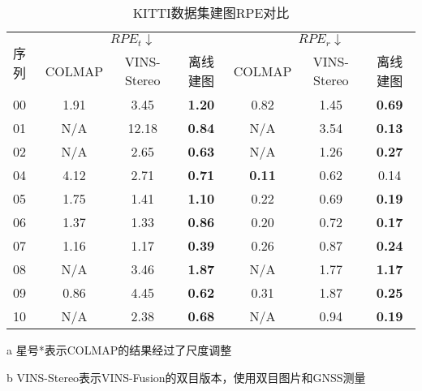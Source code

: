 \begin{table}
\centering
\begin{threeparttable}
\caption{KITTI数据集建图RPE\textdownarrow{}对比}
\begin{tabular}{lcccccc}
\toprule
\multirow{2}{*}{序列} & \multicolumn{3}{c}{$RPE_t \downarrow$}              & \multicolumn{3}{c}{$RPE_r\downarrow$}                    \\ \cline{2-7} 
                    & COLMAP & VINS-Stereo & 离线建图          & COLMAP       & VINS-Stereo & 离线建图  \\
\midrule
00                  & 1.91    & 3.45        & \cellcolor[HTML]{FFCCC9}\textbf{1.20} & 0.82          & 1.45        & \cellcolor[HTML]{FFCCC9}\textbf{0.69} \\
01                  & N/A     & 12.18       & \cellcolor[HTML]{FFCCC9}\textbf{0.84} & N/A           & 3.54        & \cellcolor[HTML]{FFCCC9}\textbf{0.13} \\
02                  & N/A     & 2.65        & \cellcolor[HTML]{FFCCC9}\textbf{0.63} & N/A           & 1.26        & \cellcolor[HTML]{FFCCC9}\textbf{0.27} \\
04                  & 4.12    & 2.71        & \cellcolor[HTML]{FFCCC9}\textbf{0.71} & \cellcolor[HTML]{FFCCC9}\textbf{0.11} & 0.62        & 0.14          \\
05                  & 1.75    & 1.41        & \cellcolor[HTML]{FFCCC9}\textbf{1.10} & 0.22          & 0.69        & \cellcolor[HTML]{FFCCC9}\textbf{0.19} \\
06                  & 1.37    & 1.33        & \cellcolor[HTML]{FFCCC9}\textbf{0.86} & 0.20          & 0.72        & \cellcolor[HTML]{FFCCC9}\textbf{0.17} \\
07                  & 1.16    & 1.17        & \cellcolor[HTML]{FFCCC9}\textbf{0.39} & 0.26          & 0.87        & \cellcolor[HTML]{FFCCC9}\textbf{0.24} \\
08                  & N/A     & 3.46        & \cellcolor[HTML]{FFCCC9}\textbf{1.87} & N/A           & 1.77        & \cellcolor[HTML]{FFCCC9}\textbf{1.17} \\
09                  & 0.86    & 4.45        & \cellcolor[HTML]{FFCCC9}\textbf{0.62} & 0.31          & 1.87        & \cellcolor[HTML]{FFCCC9}\textbf{0.25} \\
10                  & N/A     & 2.38        & \cellcolor[HTML]{FFCCC9}\textbf{0.68} & N/A           & 0.94        & \cellcolor[HTML]{FFCCC9}\textbf{0.19} \\ \bottomrule
\end{tabular}
\label{tab:map_rpe}
\begin{tablenotes}
  \item [a] 星号*表示COLMAP的结果经过了尺度调整
  \item [b] VINS-Stereo表示VINS-Fusion的双目版本，使用双目图片和GNSS测量
\end{tablenotes}
\end{threeparttable}
\end{table}

